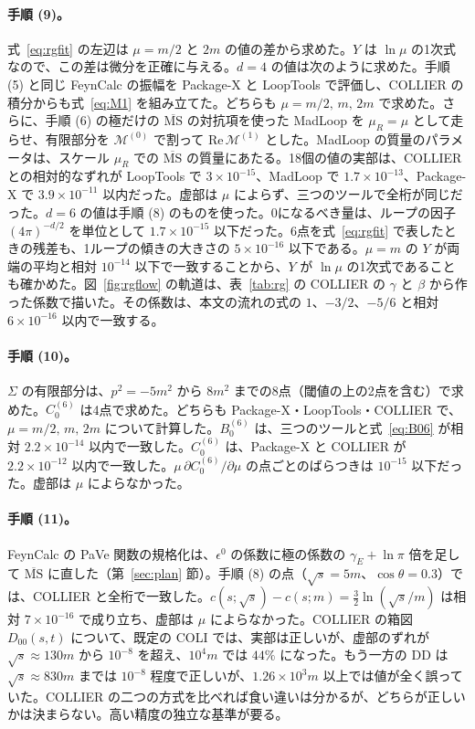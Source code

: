 \documentclass[a4paper,10pt]{ltjsarticle}
\begin{document}
\paragraph{手順 (9)。}式~\eqref{eq:rgfit} の左辺は $\mu=m/2$ と $2m$ の値の差から求めた。$Y$ は $\ln\mu$ の1次式なので、この差は微分を正確に与える。$d=4$ の値は次のように求めた。手順 (5) と同じ FeynCalc の振幅を Package-X と LoopTools で評価し、COLLIER の積分からも式~\eqref{eq:M1} を組み立てた。どちらも $\mu=m/2,\,m,\,2m$ で求めた。さらに、手順 (6) の極だけの $\overline{\mathrm{MS}}$ の対抗項を使った MadLoop を $\mu_R=\mu$ として走らせ、有限部分を $\mathcal{M}^{(0)}$ で割って $\mathrm{Re}\,\mathcal{M}^{(1)}$ とした。MadLoop の質量のパラメータは、スケール $\mu_R$ での $\overline{\mathrm{MS}}$ の質量にあたる。18個の値の実部は、COLLIER との相対的なずれが LoopTools で $3\times10^{-15}$、MadLoop で $1.7\times10^{-13}$、Package-X で $3.9\times10^{-11}$ 以内だった。虚部は $\mu$ によらず、三つのツールで全桁が同じだった。$d=6$ の値は手順 (8) のものを使った。0になるべき量は、ループの因子 $(4\pi)^{-d/2}$ を単位として $1.7\times10^{-15}$ 以下だった。6点を式~\eqref{eq:rgfit} で表したときの残差も、1ループの傾きの大きさの $5\times10^{-16}$ 以下である。$\mu=m$ の $Y$ が両端の平均と相対 $10^{-14}$ 以下で一致することから、$Y$ が $\ln\mu$ の1次式であることも確かめた。図~\ref{fig:rgflow} の軌道は、表~\ref{tab:rg} の COLLIER の $\gamma$ と $\beta$ から作った係数で描いた。その係数は、本文の流れの式の $1$、$-3/2$、$-5/6$ と相対 $6\times10^{-16}$ 以内で一致する。

\paragraph{手順 (10)。}$\Sigma$ の有限部分は、$p^2=-5m^2$ から $8m^2$ までの8点（閾値の上の2点を含む）で求めた。$C_0^{(6)}$ は4点で求めた。どちらも Package-X・LoopTools・COLLIER で、$\mu=m/2,\,m,\,2m$ について計算した。$B_0^{(6)}$ は、三つのツールと式~\eqref{eq:B06} が相対 $2.2\times10^{-14}$ 以内で一致した。$C_0^{(6)}$ は、Package-X と COLLIER が $2.2\times10^{-12}$ 以内で一致した。$\mu\,\partial C_0^{(6)}/\partial\mu$ の点ごとのばらつきは $10^{-15}$ 以下だった。虚部は $\mu$ によらなかった。

\paragraph{手順 (11)。}FeynCalc の PaVe 関数の規格化は、$\epsilon^0$ の係数に極の係数の $\gamma_E+\ln\pi$ 倍を足して $\overline{\mathrm{MS}}$ に直した（第~\ref{sec:plan} 節）。手順 (8) の点（$\sqrt s=5m$、$\cos\theta=0.3$）では、COLLIER と全桁で一致した。$c(s;\sqrt s)-c(s;m)=\frac32\ln(\sqrt s/m)$ は相対 $7\times10^{-16}$ で成り立ち、虚部は $\mu$ によらなかった。COLLIER の箱図 $D_{00}(s,t)$ について、既定の COLI では、実部は正しいが、虚部のずれが $\sqrt s\approx130m$ から $10^{-8}$ を超え、$10^4m$ では $44\%$ になった。もう一方の DD は $\sqrt s\approx830m$ までは $10^{-8}$ 程度で正しいが、$1.26\times10^3m$ 以上では値が全く誤っていた。COLLIER の二つの方式を比べれば食い違いは分かるが、どちらが正しいかは決まらない。高い精度の独立な基準が要る。
\end{document}
